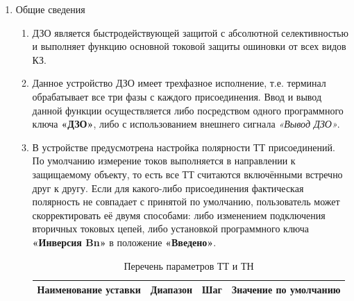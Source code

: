 \color{black}

\begin{enumerate}[label=\arabic{section}.\arabic{subsection}.\arabic{enumi}, labelsep=4pt, leftmargin=0pt, itemindent=57pt, itemsep=0pt, parsep=5pt] %

\item Общие сведения

\begin{enumerate}[label=\arabic{section}.\arabic{subsection}.\arabic{enumi}.\arabic*, labelsep=4pt, leftmargin=0em, itemindent=65pt, parsep=0pt]

\item
ДЗО является быстродействующей защитой с абсолютной селективностью и выполняет функцию основной токовой защиты ошиновки от всех видов КЗ.

\item
Данное устройство ДЗО имеет трехфазное исполнение, т.е. терминал обрабатывает все три фазы с каждого присоединения.
Ввод и вывод данной функции осуществляется либо посредством одного программного ключа \textbf{«ДЗО»}, либо с использованием внешнего сигнала \textit{«Вывод ДЗО»}.

\item
В устройстве предусмотрена настройка полярности ТТ присоединений.
По умолчанию измерение токов выполняется в направлении к защищаемому объекту, то есть все ТТ считаются включёнными встречно друг к другу.
Если для какого-либо присоединения фактическая полярность не совпадает с принятой по умолчанию, пользователь может скорректировать её двумя способами: либо изменением подключения вторичных токовых цепей, либо установкой программного ключа \textbf{«Инверсия Bn»} в положение \textbf{«Введено»}.

\small
\begin{longtable}{|>{\centering\arraybackslash}m{6.4cm}|>{\centering\arraybackslash}m{4cm}|>{\centering\arraybackslash}m{2.8cm}|>{\centering\arraybackslash}m{2.8cm}|}
\caption{Перечень параметров ТТ и ТН\hfill\vspace{-0.5\baselineskip}}\label{desc:tbl1}\\
\hline
\rowcolor{gray!30}
Наименование уставки & Диапазон & Шаг & Значение по умолчанию \\
\hline
\endfirsthead


\end{longtable}
\end{enumerate}
\end{enumerate}
